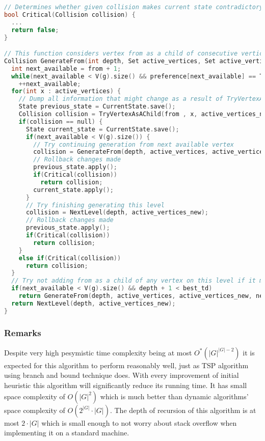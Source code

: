 \begin{lstlisting}[language=C++]
// Determines whether given collision makes current state contradictory with treedepth decomposition definition
bool Critical(Collision collision) {
  ...
  return false;
}

// This function considers vertex from as a child of consecutive vertices from active_vertices. At the time of calling this function, every vertex v < from has been considered on this level to some extent. Note that calling this function does not change current state i.e. after this function returns state is how it was before the call. It is required that preference[from] != Taken.
Collision GenerateFrom(int depth, Set active_vertices, Set active_vertices_new, int from) {
  int next_available = from + 1;
  while(next_available < V(g).size() && preference[next_available] == Taken)
    ++next_available;
  for(int x : active_vertices) {
    // Dump all information that might change as a result of TryVertexAsAChild
    State previous_state = CurrentState.save();
    Collision collision = TryVertexAsAChild(from , x, active_vertices_new);
    if(collision == null) {
      State current_state = CurrentState.save();
      if(next_available < V(g).size()) {
        // Try continuing generation from next available vertex
        collision = GenerateFrom(depth, active_vertices, active_vertices_new, next_available);
        // Rollback changes made
        previous_state.apply();
        if(Critical(collision))
          return collision;
        current_state.apply();
      }
      // Try finishing generating this level
      collision = NextLevel(depth, active_vertices_new);
      // Rollback changes made
      previous_state.apply();
      if(Critical(collision))
        return collision;
    }
    else if(Critical(collision))
      return collision;
  }
  // Try not adding from as a child of any vertex on this level if it makes sense
  if(next_available < V(g).size() && depth + 1 < best_td)
    return GenerateFrom(depth, active_vertices, active_vertices_new, next_available);
  return NextLevel(depth, active_vertices_new);
}
\end{lstlisting}
\subsubsection{Remarks}
Despite very high pesymistic time complexity being at most $O^*\left(\left|G\right|^{\left|G\right|-2}\right)$ it is expected for this algorithm to perform reasonably well, just as TSP algorithm using branch and bound technique does. With every improvement of initial heuristic this algorithm will significantly reduce its running time. It has small space complexity of $O\left(\left|G\right|^2\right)$ which is much better than dynamic algorithms' space complexity of $O\left(2^{\left|G\right|}\cdot\left|G\right|\right)$. The depth of recursion of this algorithm is at most $2\cdot\left|G\right|$ which is small enough to not worry about stack overflow when implementing it on a standard machine.
